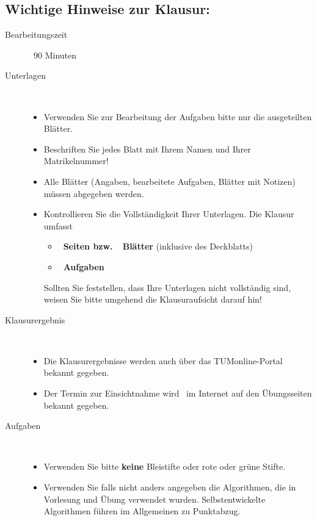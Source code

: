 \subsection*{Wichtige Hinweise zur Klausur:}
\begin{description}
  \item [Bearbeitungszeit] \
     90 Minuten
  \item [Unterlagen] \
  \begin{itemize}
    \item Verwenden Sie zur Bearbeitung der Aufgaben bitte nur die ausgeteilten Blätter.
    \item Beschriften Sie jedes Blatt mit Ihrem Namen und Ihrer Matrikelnummer!
    \item Alle Blätter (Angaben, bearbeitete Aufgaben, Blätter mit Notizen) müssen abgegeben werden.
    \item Kontrollieren Sie die Vollständigkeit Ihrer Unterlagen. Die Klausur umfasst
    \begin{itemize}
      \item \textbf{\AnzahlSeiten\ Seiten bzw.\ \AnzahlBlaetter\ Blätter}  (inklusive des Deckblatts)
      \item \textbf{\AnzahlAufgaben\ Aufgaben}
    \end{itemize}
    Sollten Sie feststellen, dass Ihre Unterlagen nicht vollständig sind, weisen Sie bitte umgehend die
    Klausuraufsicht darauf hin!
  \end{itemize}

  \item [Klausurergebnis] \
  \begin{itemize}
    \item
    Die Klausurergebnisse werden auch über das TUMonline-Portal bekannt gegeben.
    \item Der Termin zur Einsichtnahme wird \klausureinsicht\ im Internet
      auf den Übungsseiten bekannt gegeben.
  \end{itemize}

  \item [Aufgaben] \
  \begin{itemize}
    \item  Verwenden Sie bitte \textbf{keine} Bleistifte oder rote oder grüne Stifte.
    
    \item Verwenden Sie falls nicht anders angegeben die Algorithmen, die in Vorlesung und Übung verwendet
    wurden. Selbstentwickelte Algorithmen führen im Allgemeinen zu Punktabzug.
    

\end{itemize}
\end{description}
